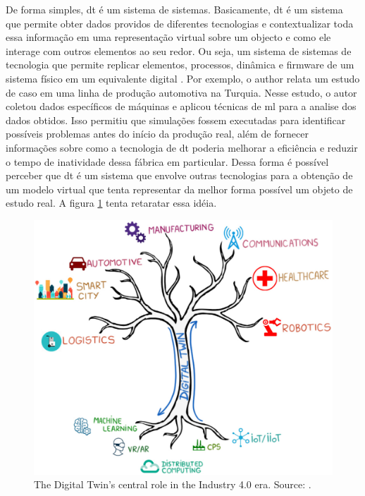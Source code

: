 De forma simples, \acrlong{dt} é um sistema de sistemas. Basicamente, \acrshort{dt} é um sistema que permite obter dados providos de diferentes tecnologias e contextualizar toda essa informação em uma representação virtual sobre um objecto e como ele interage com outros elementos ao seu redor. Ou seja, um sistema de sistemas de tecnologia que permite replicar elementos, processos, dinâmica e firmware de um sistema físico em um equivalente digital \cite{Mihai2022}. Por exemplo, o author \textcite{Mendi2022} relata um estudo de caso em uma linha de produção automotiva na Turquia. Nesse estudo, o autor coletou dados específicos de máquinas e aplicou técnicas de \acrfull{ml} para  a analise dos dados obtidos.  Isso permitiu que simulações fossem executadas para identificar possíveis problemas antes do início da produção real, além de fornecer informações sobre como a tecnologia de \acrlong{dt} poderia melhorar a eficiência e reduzir o tempo de inatividade dessa fábrica em particular. Dessa forma é possível perceber que \acrlong{dt} é um sistema que envolve outras tecnologias para a obtenção de um modelo virtual que tenta representar da melhor forma possível um objeto de estudo real. A figura \ref{fig:digitalTwinTree} tenta retaratar essa idéia. 
\begin{figure}[h!]
    \centering
    \includegraphics[scale=0.75]{images/Related/DTTree.png}
    \caption{The Digital Twin’s central role in the Industry 4.0 era. Source: \cite{Mihai2022}.}

    \label{fig:digitalTwinTree}
\end{figure}

